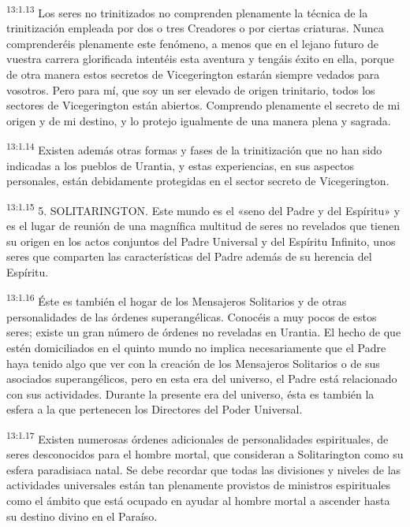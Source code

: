 \par
\textsuperscript{13:1.13} Los seres no trinitizados no comprenden plenamente la técnica de la trinitización empleada por dos o tres Creadores o por ciertas criaturas. Nunca comprenderéis plenamente este fenómeno, a menos que en el lejano futuro de vuestra carrera glorificada intentéis esta aventura y tengáis éxito en ella, porque de otra manera estos secretos de Vicegerington estarán siempre vedados para vosotros. Pero para mí, que soy un ser elevado de origen trinitario, todos los sectores de Vicegerington están abiertos. Comprendo plenamente el secreto de mi origen y de mi destino, y lo protejo igualmente de una manera plena y sagrada.

\par
\textsuperscript{13:1.14} Existen además otras formas y fases de la trinitización que no han sido indicadas a los pueblos de Urantia, y estas experiencias, en sus aspectos personales, están debidamente protegidas en el sector secreto de Vicegerington.

\par
\textsuperscript{13:1.15} 5. SOLITARINGTON. Este mundo es el «seno del Padre y del Espíritu» y es el lugar de reunión de una magnífica multitud de seres no revelados que tienen su origen en los actos conjuntos del Padre Universal y del Espíritu Infinito, unos seres que comparten las características del Padre además de su herencia del Espíritu.

\par
\textsuperscript{13:1.16} Éste es también el hogar de los Mensajeros Solitarios y de otras personalidades de las órdenes superangélicas. Conocéis a muy pocos de estos seres; existe un gran número de órdenes no reveladas en Urantia. El hecho de que estén domiciliados en el quinto mundo no implica necesariamente que el Padre haya tenido algo que ver con la creación de los Mensajeros Solitarios o de sus asociados superangélicos, pero en esta era del universo, el Padre está relacionado con sus actividades. Durante la presente era del universo, ésta es también la esfera a la que pertenecen los Directores del Poder Universal.

\par
\textsuperscript{13:1.17} Existen numerosas órdenes adicionales de personalidades espirituales, de seres desconocidos para el hombre mortal, que consideran a Solitarington como su esfera paradisiaca natal. Se debe recordar que todas las divisiones y niveles de las actividades universales están tan plenamente provistos de ministros espirituales como el ámbito que está ocupado en ayudar al hombre mortal a ascender hasta su destino divino en el Paraíso.

